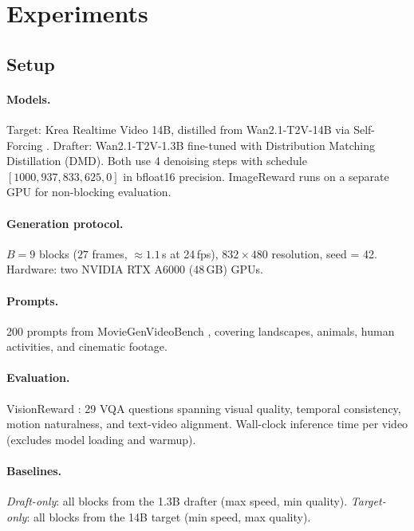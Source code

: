 \documentclass{article}
\begin{document}
\section{Experiments}
\label{sec:experiments}

\subsection{Setup}

\paragraph{Models.}
Target: Krea Realtime Video 14B, distilled from Wan2.1-T2V-14B
\citep{wan2025} via Self-Forcing \citep{selfforcing2025}.
Drafter: Wan2.1-T2V-1.3B fine-tuned with Distribution Matching
Distillation (DMD).
Both use 4 denoising steps with schedule $[1000, 937, 833, 625, 0]$
in bfloat16 precision.
ImageReward \citep{imagereward2024} runs on a separate GPU for
non-blocking evaluation.

\paragraph{Generation protocol.}
$B = 9$ blocks ($27$ frames, ${\approx}1.1$\,s at 24\,fps),
$832 \times 480$ resolution, seed = 42.
Hardware: two NVIDIA RTX A6000 (48\,GB) GPUs.

\paragraph{Prompts.}
200 prompts from MovieGenVideoBench \citep{moviegen2024}, covering
landscapes, animals, human activities, and cinematic footage.

\paragraph{Evaluation.}
VisionReward \citep{visionreward2025}: 29 VQA questions spanning visual
quality, temporal consistency, motion naturalness, and text-video alignment.
Wall-clock inference time per video (excludes model loading and warmup).

\paragraph{Baselines.}
\emph{Draft-only}: all blocks from the 1.3B drafter (max speed, min quality).
\emph{Target-only}: all blocks from the 14B target (min speed, max quality).
\end{document}
